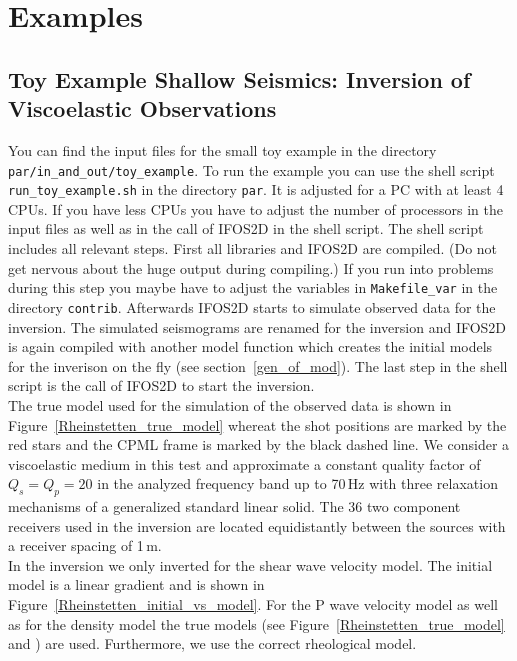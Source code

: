 
\chapter{Examples}

\section{Toy Example Shallow Seismics: Inversion of Viscoelastic Observations}
You can find the input files for the small toy example in the directory \texttt{par/in\_and\_out/toy\_example}. To run the example you can use the shell script \texttt{run\_toy\_example.sh} in the directory \texttt{par}. It is adjusted for a PC with at least 4 CPUs. If you have less CPUs you have to adjust the number of processors in the input files as well as in the call of IFOS2D in the shell script. The shell script includes all relevant steps. First all libraries and IFOS2D are compiled. (Do not get nervous about the huge output during compiling.) If you run into problems during this step you maybe have to adjust the variables in \texttt{Makefile\_var} in the directory \texttt{contrib}. Afterwards IFOS2D starts to simulate observed data for the inversion. The simulated seismograms are renamed for the inversion and IFOS2D is again compiled with another model function which creates the initial models for the inverison on the fly (see section~\ref{gen_of_mod}). The last step in the shell script is the call of IFOS2D to start the inversion.\\

The true model used for the simulation of the observed data is shown in Figure~\ref{Rheinstetten_true_model} whereat the shot positions are marked by the red stars and the CPML frame is marked by the black dashed line. We consider a viscoelastic medium in this test and approximate a constant quality factor of $Q_s=Q_p=20$ in the analyzed frequency band up to 70\,Hz with three relaxation mechanisms of a generalized standard linear solid. The 36 two component receivers used in the inversion are located equidistantly between the sources with a receiver spacing of 1\,m.\\

In the inversion we only inverted for the shear wave velocity model. The initial model is a linear gradient and is shown in Figure~\ref{Rheinstetten_initial_vs_model}.  For the P wave velocity model as well as for the density model the true models (see Figure~\ref{Rheinstetten_true_model} and ) are used. Furthermore, we use the correct rheological model.\\

